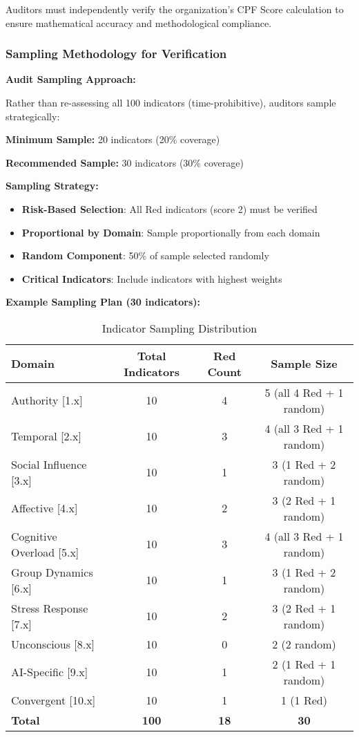 \documentclass[11pt,a4paper]{article}
\begin{document}
Auditors must independently verify the organization's CPF Score calculation to ensure mathematical accuracy and methodological compliance.

\subsubsection{Sampling Methodology for Verification}

\textbf{Audit Sampling Approach:}

Rather than re-assessing all 100 indicators (time-prohibitive), auditors sample strategically:

\textbf{Minimum Sample:} 20 indicators (20\% coverage)

\textbf{Recommended Sample:} 30 indicators (30\% coverage)

\textbf{Sampling Strategy:}
\begin{itemize}
\item \textbf{Risk-Based Selection}: All Red indicators (score 2) must be verified
\item \textbf{Proportional by Domain}: Sample proportionally from each domain
\item \textbf{Random Component}: 50\% of sample selected randomly
\item \textbf{Critical Indicators}: Include indicators with highest weights
\end{itemize}

\textbf{Example Sampling Plan (30 indicators):}

\begin{table}[h]
\centering
\caption{Indicator Sampling Distribution}
\small
\begin{tabular}{lccc}
\toprule
\textbf{Domain} & \textbf{Total Indicators} & \textbf{Red Count} & \textbf{Sample Size} \\
\midrule
Authority [1.x] & 10 & 4 & 5 (all 4 Red + 1 random) \\
Temporal [2.x] & 10 & 3 & 4 (all 3 Red + 1 random) \\
Social Influence [3.x] & 10 & 1 & 3 (1 Red + 2 random) \\
Affective [4.x] & 10 & 2 & 3 (2 Red + 1 random) \\
Cognitive Overload [5.x] & 10 & 3 & 4 (all 3 Red + 1 random) \\
Group Dynamics [6.x] & 10 & 1 & 3 (1 Red + 2 random) \\
Stress Response [7.x] & 10 & 2 & 3 (2 Red + 1 random) \\
Unconscious [8.x] & 10 & 0 & 2 (2 random) \\
AI-Specific [9.x] & 10 & 1 & 2 (1 Red + 1 random) \\
Convergent [10.x] & 10 & 1 & 1 (1 Red) \\
\midrule
\textbf{Total} & \textbf{100} & \textbf{18} & \textbf{30} \\
\bottomrule
\end{tabular}
\end{table}
\end{document}
